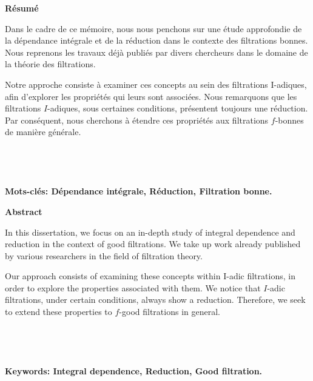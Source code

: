 \newpage
{}
\begin{center}
	\LARGE{\textbf{Résumé}}
\end{center}

Dans le cadre de ce mémoire, nous nous penchons sur une étude approfondie de la dépendance intégrale et de la réduction dans le contexte des filtrations bonnes. Nous reprenons les travaux déjà publiés par divers chercheurs dans le domaine de la théorie des filtrations.

Notre approche consiste à examiner ces concepts au sein des filtrations I-adiques, afin d’explorer les propriétés qui leurs sont associées. Nous remarquons que les filtrations $I$-adiques, sous certaines conditions, présentent toujours une réduction. Par conséquent, nous cherchons à étendre ces propriétés aux filtrations $f$-bonnes de manière générale.
\\
\\
\\
\\
\\
\textbf{ Mots-clés: Dépendance intégrale, Réduction, Filtration bonne.} 



\newpage
{}
\begin{center}
	\LARGE{\textbf{Abstract}}
\end{center}

In this dissertation, we focus on an in-depth study of integral dependence and reduction in the context of good filtrations. We take up work already published by various researchers in the field of filtration theory.

Our approach consists of examining these concepts within I-adic filtrations, in order to explore the properties associated with them. We notice that $I$-adic filtrations, under certain conditions, always show a reduction. Therefore, we seek to extend these properties to $f$-good filtrations in general.
\\
\\
\\
\\
\\
\textbf{Keywords: Integral dependence, Reduction, Good filtration.} 